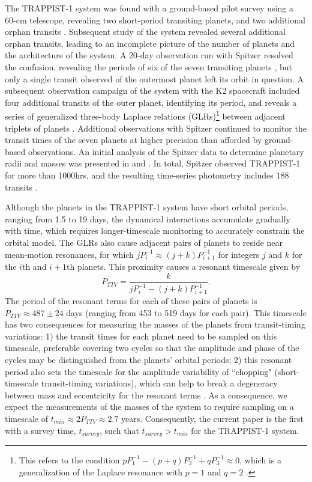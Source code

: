 \documentclass[twocolumn]{aastex63}
\begin{document}
The TRAPPIST-1 system was found with a ground-based pilot survey using a 60-cm telescope, 
revealing two short-period transiting planets, and two additional orphan transits 
\citep{Gillon2016, Burdanov2018}.  Subsequent study of the system revealed several 
additional orphan transits, leading to an incomplete picture of the number of planets 
and the architecture of the system.  A 20-day observation run with Spitzer resolved the 
confusion, revealing the periods of six of the seven transiting planets \citep{Gillon2017},
but only a single transit observed of the outermost planet left its orbit in question.  
A subsequent observation campaign of the system with the K2 spacecraft included four 
additional transits of the outer planet, identifying its period, and reveals a series
of generalized three-body Laplace relations (GLRs)\footnote{This refers to the condition 
$pP_1^{-1}-(p+q)P_2^{-1}+qP_3^{-1} \approx 0$, which is a generalization of the Laplace 
resonance with $p=1$ and $q=2$ \citep{Papaloizou2014}. } between adjacent triplets of 
planets \citep{Luger2017a}.  Additional observations with Spitzer 
continued to monitor the transit times of the seven planets at higher precision than 
afforded by ground-based observations. An initial analysis of the Spitzer data to determine 
planetary radii and masses was presented in \citet{Delrez2018a} and \citet{Grimm2018}. In total, 
Spitzer observed TRAPPIST-1 for more than 1000hrs, and the resulting time-series photometry 
includes 188 transits \citep{Ducrot2020}.

Although the planets in the TRAPPIST-1 system have short orbital periods, ranging from
1.5 to 19 days, the dynamical interactions accumulate gradually with time, which requires 
longer-timescale monitoring to accurately constrain the orbital model.
The GLRs also cause adjacent pairs of planets to reside near mean-motion resonances, 
for which $j P_i^{-1} \approx (j+k) P_{i+1}^{-1}$ for integers $j$ and $k$ for the $i$th and $i+1$th planets.  This proximity causes a resonant timescale 
given by
\begin{equation}
    P_{TTV} = \frac{k}{j P_i^{-1} - (j+k) P_{i+1}^{-1}}.
\end{equation} 
The period of the resonant terms for each of these pairs of planets is $P_{TTV} \approx 487\pm 24$ 
days (ranging from 453 to 519 days for each pair).  This timescale has two consequences for 
measuring the masses of the planets from transit-timing variations:  1)  the transit times 
for each planet need to be sampled on this timescale, preferable covering two cycles so that 
the amplitude and phase of the cycles may be distinguished from the planets' orbital periods; 
2) this resonant period also sets the timescale for the amplitude variability of ``chopping" (short-timescale 
transit-timing variations), which can help to break a degeneracy between mass and eccentricity for the resonant terms 
\citep{Lithwick2012,Deck2015}.  As a consequence, we expect the measurements of the masses 
of the system to require sampling on a timescale of $t_{min} \approx 2 P_{TTV} \approx 2.7$ years.  
Consequently, the current paper is the first with a survey time, $t_{survey}$, such that $t_{survey} {>} t_{min}$ for the TRAPPIST-1 system.
\end{document}
